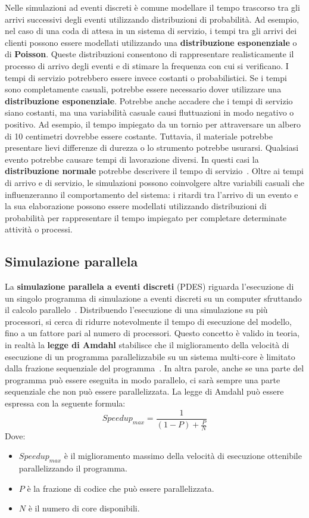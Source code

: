 \documentclass[12pt,a4paper,openright,twoside]{book}
\begin{document}
Nelle simulazioni ad eventi discreti è comune modellare il tempo trascorso tra gli arrivi successivi degli eventi utilizzando distribuzioni di probabilità. 
Ad esempio, nel caso di una coda di attesa in un sistema di servizio, i tempi tra gli arrivi dei clienti possono essere modellati utilizzando una \textbf{distribuzione esponenziale} o di \textbf{Poisson}. Queste distribuzioni consentono di rappresentare realisticamente il processo di arrivo degli eventi e di stimare la frequenza con cui si verificano.
I tempi di servizio potrebbero essere invece costanti o probabilistici. Se i tempi sono completamente casuali, potrebbe essere necessario dover utilizzare una \textbf{distribuzione esponenziale}. Potrebbe anche accadere che i tempi di servizio siano costanti, ma una variabilità casuale causi fluttuazioni in modo negativo o positivo. Ad esempio, il tempo impiegato da un tornio per attraversare un albero di 10 centimetri dovrebbe essere costante. Tuttavia, il materiale potrebbe presentare lievi differenze di durezza o lo strumento potrebbe usurarsi. Qualsiasi evento potrebbe causare tempi di lavorazione diversi. In questi casi la \textbf{distribuzione normale} potrebbe descrivere il tempo di servizio~\cite{DBLP:books/daglib/0034857}.
Oltre ai tempi di arrivo e di servizio, le simulazioni possono coinvolgere altre variabili casuali che influenzeranno il comportamento del sistema: i ritardi tra l'arrivo di un evento e la sua elaborazione possono essere modellati utilizzando distribuzioni di probabilità per rappresentare il tempo impiegato per completare determinate attività o processi. 

\subsection{Simulazione parallela}
La \textbf{simulazione parallela a eventi discreti} (PDES) riguarda l'esecuzione di un singolo programma di simulazione a eventi discreti su un computer sfruttando il calcolo parallelo~\cite{DBLP:journals/cacm/Fujimoto90}. Distribuendo l'esecuzione di una simulazione su più processori, si cerca di ridurre notevolmente il tempo di esecuzione del modello, fino a un fattore pari al numero di processori. Questo concetto è valido in teoria, in realtà la \textbf{legge di Amdahl} stabilisce che il miglioramento della velocità di esecuzione di un programma parallelizzabile su un sistema multi-core è limitato dalla frazione sequenziale del programma~\cite{DBLP:conf/afips/Amdahl67}. In altra parole, anche se una parte del programma può essere eseguita in modo parallelo, ci sarà sempre una parte sequenziale che non può essere parallelizzata. La legge di Amdahl può essere espressa con la seguente formula: 
$$
Speedup_{max} = \frac{1}{(1-P)+\frac{P}{N}}
$$
Dove: 
\begin{itemize}
    \item $Speedup_{max}$ è il miglioramento massimo della velocità di esecuzione ottenibile parallelizzando il programma. 
    \item $P$ è la frazione di codice che può essere parallelizzata. 
    \item $N$ è il numero di core disponibili.
\end{itemize}
\end{document}
